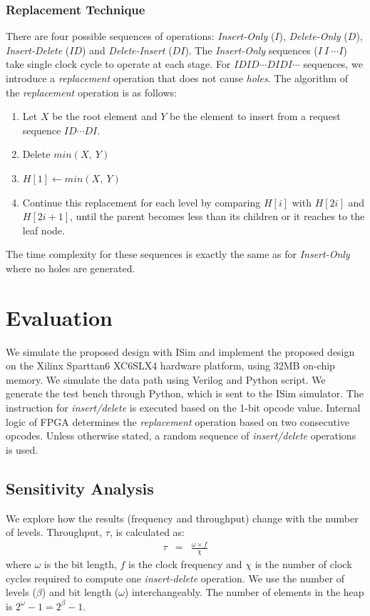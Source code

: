 \documentclass[10pt, conference, compsocconf]{IEEEtran}
\begin{document}
\subsubsection{Replacement Technique}
 There are four possible sequences of operations: {\it Insert-Only} ($I$), {\it Delete-Only} ($D$), {\it Insert-Delete} ($ID$) and {\it Delete-Insert} ($DI$).
The {\it Insert-Only} sequences ($I \ I \ \cdots I $) take single clock cycle to operate at each stage.
For $IDID \cdots DIDI \cdots$ sequences, we introduce a {\it replacement} operation that does not cause {\it holes}.
The algorithm of the {\it replacement} operation is as follows:
 \begin{enumerate}
 \item Let $X$ be the root element and $Y$ be the element to insert from a request sequence $ID \cdots DI$.
 \item Delete $min(X, \ Y)$
 \item $H[1] \leftarrow min(X,\ Y)$
 \item Continue this replacement for each level by comparing $H[i]$ with $H[2i]$ and $H[2i+1]$, until the parent becomes less than its children or it reaches to the leaf node.
 \end{enumerate}
The time complexity for these sequences is exactly the same as for {\it Insert-Only} where no holes are generated.

\section{Evaluation}

We simulate the proposed design with ISim and implement the proposed design on the Xilinx Sparttan6 XC6SLX4 hardware platform, using 32MB on-chip memory.
We simulate the data path using Verilog and Python script.
We generate the test bench through Python, which is sent to the ISim simulator.
The instruction for {\it insert/delete} is executed based on the 1-bit opcode value.
Internal logic of FPGA determines the {\it replacement} operation based on two consecutive opcodes.
Unless otherwise stated, a random sequence of {\it insert/delete} operations is used.

\subsection{Sensitivity Analysis}

We explore how the results (frequency and throughput) change with the number of levels.
Throughput, $\tau$, is calculated as:
\begin{eqnarray}
\tau &=&  \frac{\omega \times  f}{\chi}
\end{eqnarray}
 where $\omega$ is the bit length, $f$ is the clock frequency and $\chi$ is the number of clock cycles required to compute one {\it insert-delete} operation.
We use the number of levels ($\beta$) and bit length ($\omega$) interchangeably.
The number of elements in the heap is $2^\omega-1 = 2^\beta -1$.
\end{document}
